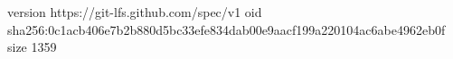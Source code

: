 version https://git-lfs.github.com/spec/v1
oid sha256:0c1acb406e7b2b880d5bc33efe834dab00e9aacf199a220104ac6abe4962eb0f
size 1359
